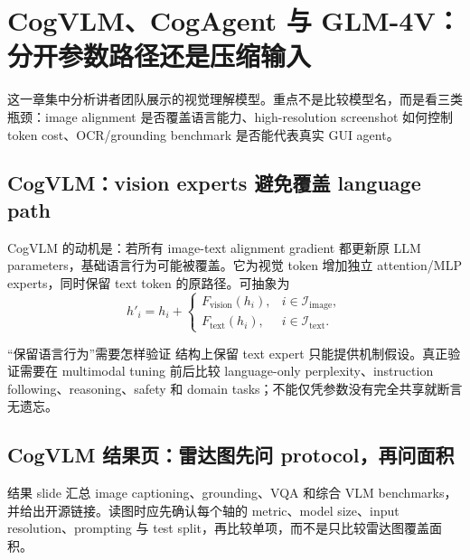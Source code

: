 \section{CogVLM、CogAgent 与 GLM-4V：分开参数路径还是压缩输入}

这一章集中分析讲者团队展示的视觉理解模型。重点不是比较模型名，而是看三类瓶颈：image alignment 是否覆盖语言能力、high-resolution screenshot 如何控制 token cost、OCR/grounding benchmark 是否能代表真实 GUI agent。

\subsection{CogVLM：vision experts 避免覆盖 language path}

CogVLM 的动机是：若所有 image-text alignment gradient 都更新原 LLM parameters，基础语言行为可能被覆盖。它为视觉 token 增加独立 attention/MLP experts，同时保留 text token 的原路径。可抽象为
\[
h'_{i}=h_i+\begin{cases}
F_{\text{vision}}(h_i), & i\in\mathcal{I}_{\text{image}},\\
F_{\text{text}}(h_i), & i\in\mathcal{I}_{\text{text}}.
\end{cases}
\]


\begin{importantbox}{“保留语言行为”需要怎样验证}
结构上保留 text expert 只能提供机制假设。真正验证需要在 multimodal tuning 前后比较 language-only perplexity、instruction following、reasoning、safety 和 domain tasks；不能仅凭参数没有完全共享就断言无遗忘。
\end{importantbox}


\subsection{CogVLM 结果页：雷达图先问 protocol，再问面积}

结果 slide 汇总 image captioning、grounding、VQA 和综合 VLM benchmarks，并给出开源链接。读图时应先确认每个轴的 metric、model size、input resolution、prompting 与 test split，再比较单项，而不是只比较雷达图覆盖面积。


